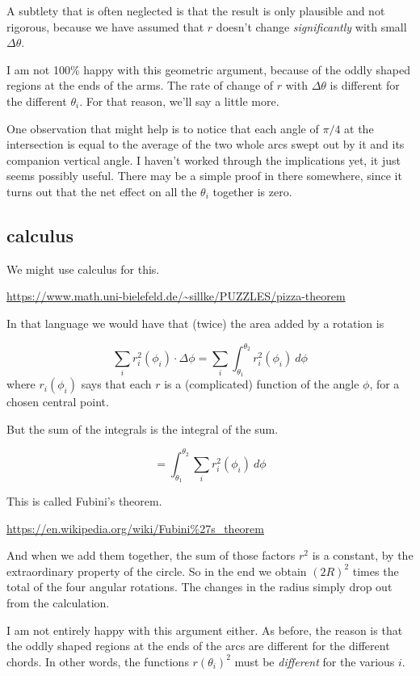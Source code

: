 \documentclass[11pt, oneside]{article}
\begin{document}
A subtlety that is often neglected is that the result is only plausible and not rigorous, because we have assumed that $r$ doesn't change \emph{significantly} with small $\Delta \theta$.  

I am not 100\% happy with this geometric argument, because of the oddly shaped regions at the ends of the arms.  The rate of change of $r$ with $\Delta \theta$ is different for the different $\theta_i$.  For that reason, we'll say a little more.

One observation that might help is to notice that each angle of $\pi/4$ at the intersection is equal to the average of the two whole arcs swept out by it and its companion vertical angle.  I haven't worked through the implications yet, it just seems possibly useful.  There may be a simple proof in there somewhere, since it turns out that the net effect on all the $\theta_i$ together is zero.

\subsection*{calculus}

We might use calculus for this.

\url{https://www.math.uni-bielefeld.de/~sillke/PUZZLES/pizza-theorem}

In that language we would have that (twice) the area added by a rotation is

\[ \sum_i r_i^2 (\phi_i) \cdot \Delta \phi = \sum_i  \int_{\theta_1}^{\theta_2} r_i^2 (\phi_i) \ d \phi \]
where $r_i(\phi_i)$ says that each $r$ is a (complicated) function of the angle $\phi$, for a chosen central point.

But the sum of the integrals is the integral of the sum.  

\[ = \int_{\theta_1}^{\theta_2}  \sum_i  r_i^2 (\phi_i) \ d \phi \]

This is called Fubini's theorem.

\url{https://en.wikipedia.org/wiki/Fubini%27s_theorem}

And when we add them together, the sum of those factors $r^2$ is a constant, by the extraordinary property of the circle.  So in the end we obtain $(2R)^2$ times the total of the four angular rotations.  The changes in the radius simply drop out from the calculation.

I am not entirely happy with this argument either.  As before, the reason is that the oddly shaped regions at the ends of the arcs are different for the different chords.  In other words, the functions $r(\theta_i)^2$ must be \emph{different} for the various $i$.
\end{document}
